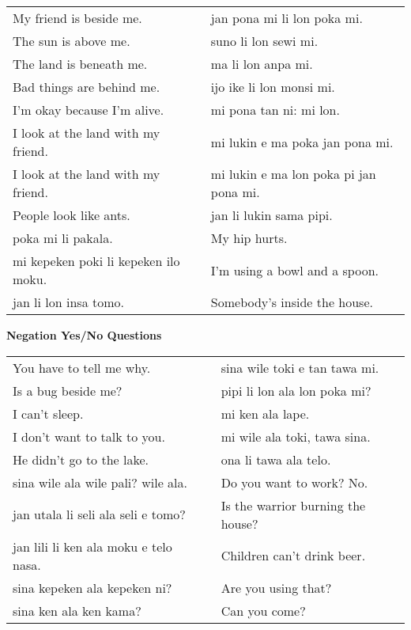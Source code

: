 \begin{supertabular}{p{5,5cm}|ll}
My friend is beside me. && jan pona mi li lon poka mi. \\ %
The sun is above me. && suno li lon sewi mi. \\ %
The land is beneath me. && ma li lon anpa mi. \\ %
Bad things are behind me. && ijo ike li lon monsi mi. \\ %
I'm okay because I'm alive. && mi pona tan ni: mi lon. \\ %
I look at the land with my friend.  && mi lukin e ma poka jan pona mi. \\ %
I look at the land with my friend.  && mi lukin e ma lon poka pi jan pona mi. \\ %
People look like ants.  && jan li lukin sama pipi. \\ %
poka mi li pakala.  && My hip hurts. \\
mi kepeken poki li kepeken ilo moku.  && I'm using a bowl and a spoon. \\
jan li lon insa tomo.  && Somebody's inside the house. \\
\end{supertabular} 

\textbf{Negation Yes/No Questions} 
\label{'negation_yes_no_questions'}

\begin{supertabular}{p{5,5cm}|ll}
You have to tell me why.  && sina wile toki e tan tawa mi. \\ %
Is a bug beside me?  && pipi li lon ala lon poka mi? \\ %
I can't sleep.  && mi ken ala lape. \\ %
I don't want to talk to you.  && mi wile ala toki, tawa sina. \\ %
He didn't go to the lake.  && ona li tawa ala telo. \\ %
sina wile ala wile pali? wile ala.  && Do you want to work? No. \\
jan utala li seli ala seli e tomo?  && Is the warrior burning the house? \\
jan lili li ken ala moku e telo nasa.  && Children can't drink beer. \\
sina kepeken ala kepeken ni?  && Are you using that? \\
sina ken ala ken kama?  && Can you come? \\
\end{supertabular} 

